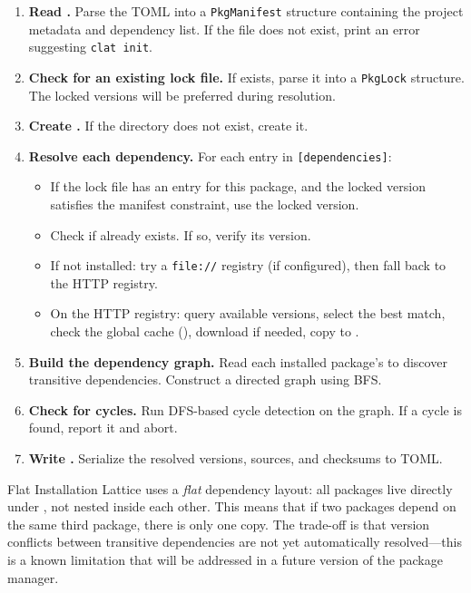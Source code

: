 \begin{enumerate}
  \item \textbf{Read .}
  Parse the TOML into a \lstinline|PkgManifest| structure containing the project metadata and dependency list.
  If the file does not exist, print an error suggesting \texttt{clat init}.

  \item \textbf{Check for an existing lock file.}
  If  exists, parse it into a \lstinline|PkgLock| structure.
  The locked versions will be preferred during resolution.

  \item \textbf{Create .}
  If the directory does not exist, create it.

  \item \textbf{Resolve each dependency.}
  For each entry in \texttt{[dependencies]}:
  \begin{itemize}[nosep]
    \item If the lock file has an entry for this package, and the locked version satisfies the manifest constraint, use the locked version.
    \item Check if  already exists. If so, verify its version.
    \item If not installed: try a \lstinline|file://| registry (if configured), then fall back to the HTTP registry.
    \item On the HTTP registry: query available versions, select the best match, check the global cache (), download if needed, copy to .
  \end{itemize}

  \item \textbf{Build the dependency graph.}
  Read each installed package's  to discover transitive dependencies.
  Construct a directed graph using BFS\@.

  \item \textbf{Check for cycles.}
  Run DFS-based cycle detection on the graph.
  If a cycle is found, report it and abort.

  \item \textbf{Write .}
  Serialize the resolved versions, sources, and checksums to TOML\@.
\end{enumerate}

\begin{notebox}{Flat Installation}
Lattice uses a \emph{flat} dependency layout: all packages live directly under , not nested inside each other.
This means that if two packages depend on the same third package, there is only one copy.
The trade-off is that version conflicts between transitive dependencies are not yet automatically resolved---this is a known limitation that will be addressed in a future version of the package manager.
\end{notebox}

